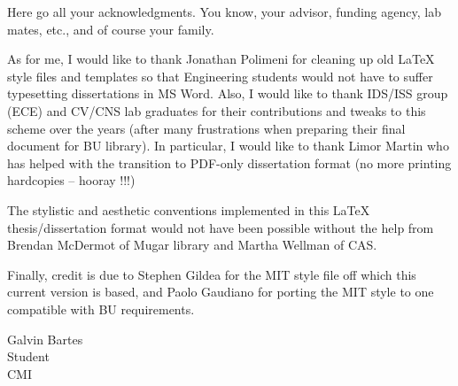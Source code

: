 Here go all your acknowledgments. You know, your advisor, funding agency, lab
mates, etc., and of course your family.

As for me, I would like to thank Jonathan Polimeni for cleaning up old LaTeX
style files and templates so that Engineering students would not have to suffer
typesetting dissertations in MS Word. Also, I would like to thank IDS/ISS
group (ECE) and CV/CNS lab graduates for their contributions and tweaks to this
scheme over the years (after many frustrations when preparing their final
document for BU library). In particular, I would like to thank Limor Martin who
has helped with the transition to PDF-only dissertation format (no more printing
hardcopies -- hooray !!!)

The stylistic and aesthetic conventions implemented in this LaTeX
thesis/dissertation format would not have been possible without the help from
Brendan McDermot of Mugar library and Martha Wellman of CAS.

Finally, credit is due to Stephen Gildea for the MIT style file off which this
current version is based, and Paolo Gaudiano for porting the MIT style to one
compatible with BU requirements.

\vskip 1in

\noindent
Galvin Bartes\\
Student\\
CMI